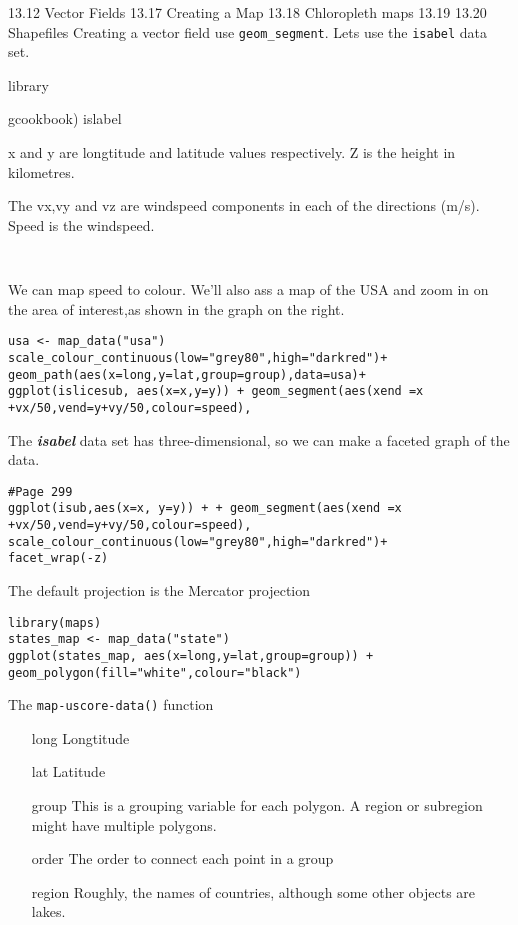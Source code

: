 13.12 Vector Fields
13.17 Creating a Map
13.18 Chloropleth maps
13.19 
13.20 Shapefiles
Creating a vector field
use \texttt{geom_segment}. Lets use the \texttt{isabel} data set.


library{gcookbook)
islabel

x and y are longtitude and latitude values respectively.
Z is the height in kilometres.

The vx,vy and vz are windspeed components in each of the directions (m/s).
Speed is the windspeed.

\begin{framed}
\begin{verbatim}


\end{verbatim}
\end{framed}

We can map speed to colour. We'll also ass a map of 
the USA and zoom in on the area of interest,as shown in the graph on the right.

\begin{verbatim}
usa <- map_data("usa")
scale_colour_continuous(low="grey80",high="darkred")+
geom_path(aes(x=long,y=lat,group=group),data=usa)+
ggplot(islicesub, aes(x=x,y=y)) + geom_segment(aes(xend =x +vx/50,vend=y+vy/50,colour=speed),
\end{verbatim}
The \textbf{\textit{isabel}} data set has three-dimensional, so we can make a faceted graph of the data.

\begin{verbatim}
#Page 299
ggplot(isub,aes(x=x, y=y)) + + geom_segment(aes(xend =x +vx/50,vend=y+vy/50,colour=speed),
scale_colour_continuous(low="grey80",high="darkred")+
facet_wrap(-z)
\end{verbatim}


The default projection is the Mercator projection

\begin{verbatim}
library(maps)
states_map <- map_data("state")
ggplot(states_map, aes(x=long,y=lat,group=group)) + geom_polygon(fill="white",colour="black")
\end{verbatim}

The \texttt{map-uscore-data()} function

\begin{itemize}
\item[long] Longtitude
\item[lat] Latitude
\item[group] This is a grouping variable for each polygon. A region or subregion might have multiple polygons.
\item[order] The order to connect each point in a group
\item[region] Roughly, the names of countries, although some other objects are lakes.
\end{itemize}




}
